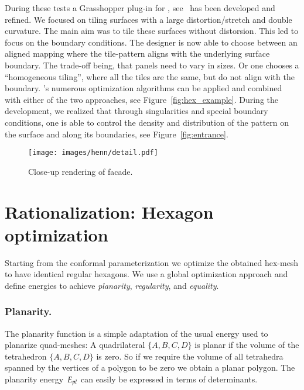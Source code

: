 \documentclass[Thesis.tex]{subfiles}
\begin{document}
During these tests a Grasshopper plug-in for \VaryLab,
see~\cite{varylab-web-page} has been developed and refined. We focused
on tiling surfaces with a large distortion/stretch and double
curvature. The main aim was to tile these surfaces without
distorsion. This led to focus on the boundary conditions. The designer
is now able to choose between an aligned mapping where the tile-pattern
aligns with the underlying surface boundary. The trade-off being, that
panels need to vary in sizes. Or one chooses a ``homogeneous tiling'',
where all the tiles are the same, but do not align with the
boundary. \VaryLab's numerous optimization algorithms can be applied
and combined with either of the two approaches, see
Figure~\ref{fig:hex_example}. During the development, we realized that
through singularities and special boundary conditions, one is able to
control the density and distribution of the pattern on the surface and
along its boundaries, see Figure~\ref{fig:entrance}.

\begin{figure}[bt]
  \centering
  \texttt{[image: images/henn/detail.pdf]}
  \caption{Close-up rendering of facade.}
  \label{fig:detail}
\end{figure}


\newcommand{\Ealpha}{E_\alpha}
\newcommand{\Eedge}{E_\ell}

\section{Rationalization: Hexagon optimization}
\label{sec:regular_hexagons}

Starting from the conformal parameterization we optimize the obtained
hex-mesh to have identical regular hexagons. We use a global
optimization approach and define energies to achieve \emph{planarity},
\emph{regularity}, and \emph{equality}.

\subsubsection{Planarity.} 
The planarity function is a simple adaptation of the usual energy used
to planarize quad-meshes: A quadrilateral $\{A, B, C, D\}$ is planar
if the volume of the tetrahedron $\{A, B, C, D\}$ is zero. So if we
require the volume of all tetrahedra spanned by the vertices of a polygon
to be zero we obtain a planar polygon.  The planarity energy~$E_{pl}$
can easily be expressed in terms of determinants.
\end{document}

